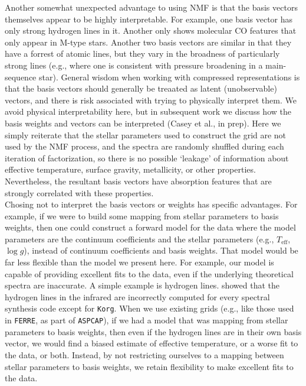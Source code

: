 \documentclass[modern]{aastex631}
\begin{document}
Another somewhat unexpected advantage to using NMF is that the basis vectors themselves appear to be highly interpretable. For example, one basis vector has only strong hydrogen lines in it. Another only shows molecular CO features that only appear in M-type stars. Another two basis vectors are similar in that they have a forrest of atomic lines, but they vary in the broadness of particularly strong lines (e.g., where one is consistent with pressure broadening in a main-sequence star). General wisdom when working with compressed representations is that the basis vectors should generally be treaated as latent (unobservable) vectors, and there is risk associated with trying to physically interpret them. We avoid physical interpretability here, but in subsequent work we discuss how the basis weights and vectors can be interpreted (Casey et al., in prep). Here we simply reiterate that the stellar parameters used to construct the grid are not used by the NMF process, and the spectra are randomly shuffled during each iteration of factorization, so there is no possible `leakage' of information about effective temperature, surface gravity, metallicity, or other properties. Nevertheless, the resultant basis vectors have absorption features that are strongly correlated with these properties. \\

Chosing not to interpret the basis vectors or weights has specific advantages. For example, if we were to build some mapping from stellar parameters to basis weights, then one could construct a forward model for the data where the model parameters are the continuum coefficients and the stellar parameters (e.g., $T_\mathrm{eff}$, $\log{g}$), instead of continuum coefficients and basis weights. That model would be far less flexible than the model we present here. For example, our model is capable of providing excellent fits to the data, even if the underlying theoretical spectra are inaccurate. A simple example is hydrogen lines. \citep{Wheeler} showed that the hydrogen lines in the infrared are incorrectly computed for every spectral synthesis code except for \texttt{Korg}. When we use existing grids (e.g., like those used in \texttt{FERRE}, as part of \texttt{ASPCAP}), if we had a model that was mapping from stellar parameters to basis weights, then even if the hydrogen lines are in their own basis vector, we would find a biased estimate of effective temperature, or a worse fit to the data, or both. Instead, by not restricting ourselves to a mapping between stellar parameters to basis weights, we retain flexibility to make excellent fits to the data.\\
\end{document}
